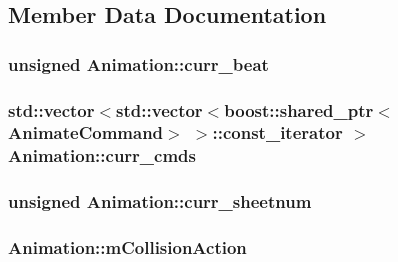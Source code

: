 \subsection{Member Data Documentation}
\hypertarget{a00010_acef8e877990ac43138c8e29436c6c38d}{
\subsubsection[{curr\-\_\-beat}]{\setlength{\rightskip}{0pt plus 5cm}unsigned Animation\-::curr\-\_\-beat\hspace{0.3cm}{\ttfamily [private]}}}\label{a00010_acef8e877990ac43138c8e29436c6c38d}
\hypertarget{a00010_a9e66fe602b1bacfac5a65921b1976875}{
\subsubsection[{curr\-\_\-cmds}]{\setlength{\rightskip}{0pt plus 5cm}std\-::vector$<$std\-::vector$<$boost\-::shared\-\_\-ptr$<${\bf Animate\-Command}$>$ $>$\-::const\-\_\-iterator $>$ Animation\-::curr\-\_\-cmds\hspace{0.3cm}{\ttfamily [private]}}}\label{a00010_a9e66fe602b1bacfac5a65921b1976875}
\hypertarget{a00010_a8aca3cfaa97f1c60edd531ef2f9c2d53}{
\subsubsection[{curr\-\_\-sheetnum}]{\setlength{\rightskip}{0pt plus 5cm}unsigned Animation\-::curr\-\_\-sheetnum\hspace{0.3cm}{\ttfamily [private]}}}\label{a00010_a8aca3cfaa97f1c60edd531ef2f9c2d53}
\hypertarget{a00010_a8f4074da4b09a0fd464099f193354833}{
\subsubsection[{m\-Collision\-Action}]{ Animation\-::m\-Collision\-Action\hspace{0.3cm}{\ttfamily [private]}}}\label{a00010_a8f4074da4b09a0fd464099f193354833}
